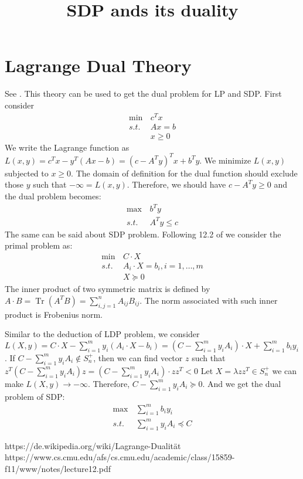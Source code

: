 \documentclass{article}
\title{SDP ands its duality}
\DeclareMathOperator{\tr}{Tr}
\begin{document}
\maketitle
\section{Lagrange Dual Theory}
See \cite{dual}. This theory can be used to get the dual problem for LP and SDP.
First consider
\begin{align*}
\min\, & c^T x \\
s.t. \,& Ax = b \\
&x \geq 0
\end{align*}
We write the Lagrange function as
$L(x,y) = c^T x - y^T(Ax-b) = (c - A^Ty)^Tx + b^T y$.
We minimize $L(x,y)$ subjected to $x \geq 0$. The domain of definition for the dual function should exclude
those $y$ such that $-\infty = L(x,y)$. Therefore, we should have $c-A^Ty \geq 0$ and
the dual problem becomes:
\begin{align*}
\max\, & b^T y \\
s.t. \,& A^T y \leq c
\end{align*}
The same can be said about SDP problem. Following 12.2 of \cite{sdp} we consider the primal problem as:
\begin{align*}
\min\,& C \cdot X \\
s.t. \,& A_i \cdot X = b_i, i=1,\dots, m \\
& X \succeq 0
\end{align*}
The inner product of two symmetric matrix is defined by $A\cdot B = \tr(A^TB) = \sum_{i,j=1}^n A_{ij}B_{ij}$.
The norm associated with such inner product is Frobenius norm.

Similar to the deduction of LDP problem, we consider $L(X,y)= C\cdot X - \sum_{i=1}^m y_i (A_i \cdot X - b_i)
=(C-\sum_{i=1}^m y_i A_i)\cdot X + \sum_{i=1}^m b_i y_i$.
If $C-\sum_{i=1}^m y_i A_i \not\in S_n^+$, then we can find vector $z$ such that 
$z^T(C-\sum_{i=1}^m y_i A_i)z = (C-\sum_{i=1}^m y_i A_i) \cdot zz^T < 0$ Let $X=\lambda zz^T \in S_n^+$
we can make $L(X,y) \to -\infty$. Therefore, $C-\sum_{i=1}^m y_i A_i \succeq 0$.
And we get the dual problem of SDP:
\begin{align*}
\max\,&\sum_{i=1}^m b_i y_i \\
s.t.\,& \sum_{i=1}^m y_i A_i \preceq C
\end{align*}
\begin{thebibliography}{9}
	 https://de.wikipedia.org/wiki/Lagrange-Dualität
	 https://www.cs.cmu.edu/afs/cs.cmu.edu/academic/class/15859-f11/www/notes/lecture12.pdf
\end{thebibliography}
\end{document}
